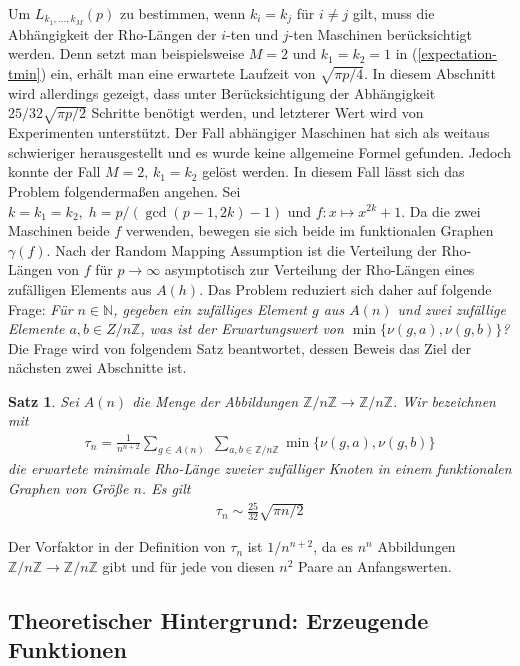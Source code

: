 \documentclass[a4paper, 10pt, ngerman]{article}
\newcommand{\N}{\mathbb{N}}
\newcommand{\Z}{\mathbb{Z}}
\newtheorem{theorem}{Satz}
\begin{document}
Um $L_{k_1, \dots, k_M}(p)$ zu bestimmen, wenn $k_i = k_j$ für $i \ne j$ gilt, muss die Abhängigkeit der Rho-Längen der $i$-ten und $j$-ten Maschinen berücksichtigt werden. Denn setzt man beispielsweise $M = 2$ und $k_1 = k_2 = 1$ in (\ref{expectation-tmin}) ein, erhält man eine erwartete Laufzeit von $\sqrt {\pi p / 4}$. In diesem Abschnitt wird allerdings gezeigt, dass unter Berücksichtigung der Abhängigkeit $25/32 \sqrt{\pi p / 2}$ Schritte benötigt werden, und letzterer Wert wird von Experimenten unterstützt. Der Fall abhängiger Maschinen hat sich als weitaus schwieriger herausgestellt und es wurde keine allgemeine Formel gefunden. Jedoch konnte der Fall $M = 2, \, k_1 = k_2$ gelöst werden. In diesem Fall lässt sich das Problem folgendermaßen angehen. Sei $k = k_1 = k_2, \; h = p/(\gcd(p - 1, 2k) - 1)$ und $f : x \mapsto x^{2k} + 1$. Da die zwei Maschinen beide $f$ verwenden, bewegen sie sich beide im funktionalen Graphen $\gamma(f)$. Nach der Random Mapping Assumption ist die Verteilung der Rho-Längen von $f$ für $p \to \infty$ asymptotisch zur Verteilung der Rho-Längen eines zufälligen Elements aus $A(h)$. Das Problem reduziert sich daher auf folgende Frage: \emph{Für $n \in \N$, gegeben ein zufälliges Element $g$ aus $A(n)$ und zwei zufällige Elemente $a, b \in Z/n\Z$, was ist der Erwartungswert von $\min\{\nu(g, a), \nu(g, b)\}$?} Die Frage wird von folgendem Satz beantwortet, dessen Beweis das Ziel der nächsten zwei Abschnitte ist.

\begin{theorem}
    \label{theorem:min-rho-len-m2}
    Sei $A(n)$ die Menge der Abbildungen $\Z/n\Z \to \Z/n\Z$. Wir bezeichnen mit
    \begin{align*}
        \tau_n =  \frac 1 {n^{n + 2}}
        \sum_{g \in A(n)} \; \sum_{a, b \in \Z/n\Z}
        \min\{\nu(g, a), \nu(g, b)\}
    \end{align*}
    die erwartete minimale Rho-Länge zweier zufälliger Knoten in einem funktionalen Graphen von Größe $n$. Es gilt
    \begin{align*}
        \tau_n \sim \frac {25} {32} \sqrt{\pi n / 2}
    \end{align*}
\end{theorem}

\noindent Der Vorfaktor in der Definition von $\tau_n$ ist $1/n^{n + 2}$, da es $n^n$ Abbildungen $\Z/n\Z \to \Z/n\Z$ gibt und für jede von diesen $n^2$ Paare an Anfangswerten.

\subsection{Theoretischer Hintergrund: Erzeugende Funktionen}
\end{document}
